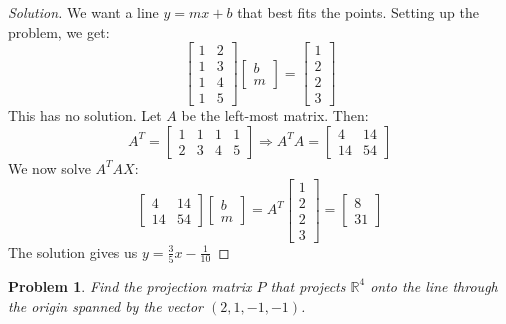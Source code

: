 \documentclass[oneside]{book}
\theoremstyle{mystyle}
\newtheorem{problem}{Problem}[section]
\begin{document}
\begin{proof}[Solution]
We want a line $y=mx+b$ that best fits the points. Setting up the problem, we get:
\begin{equation*}
    \begin{bmatrix} 1 & 2 \\ 1 & 3 \\ 1 & 4 \\ 1 & 5 \end{bmatrix} \begin{bmatrix} b \\ m \end{bmatrix} = \begin{bmatrix} 1 \\ 2 \\ 2 \\ 3\end{bmatrix}   
\end{equation*}
This has no solution. Let $A$ be the left-most matrix. Then:
\begin{equation*}
    A^T = \begin{bmatrix} 1 & 1 & 1 & 1 \\ 2 & 3 & 4 & 5 \end{bmatrix}\Rightarrow A^{T}A = \begin{bmatrix} 4 & 14 \\ 14 & 54 \end{bmatrix}
\end{equation*}
We now solve $A^{T}AX$:
\begin{equation*}
    \begin{bmatrix} 4 & 14 \\ 14 & 54 \end{bmatrix} \begin{bmatrix} b \\ m \end{bmatrix} =  A^T \begin{bmatrix} 1 \\ 2 \\ 2 \\ 3 \end{bmatrix} = \begin{bmatrix} 8 \\ 31 \end{bmatrix}   
\end{equation*}
The solution gives us $y = \frac{3}{5}x-\frac{1}{10}$
\end{proof}
\begin{problem}
Find the projection matrix $P$ that projects $\mathbb{R}^4$ onto the line through the origin spanned by the vector $(2,1,-1,-1)$.
\end{problem}
\end{document}
